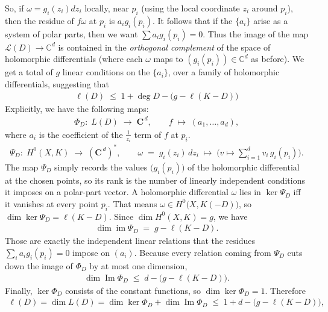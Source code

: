 \documentclass[12pt]{article}
\begin{document}
    So, if $\omega = g_i(z_i)dz_i$ locally, near $p_i$ (using the local coordinate $z_i$ around $p_i$), then the residue of $f\omega$ at $p_i$ is $a_i g_i(p_i)$. It follows that if the $\{a_i\}$ arise as a system of polar parts, then we want $\sum a_i g_i(p_i) = 0$. Thus the image of the map $\mathcal{L}(D) \to \mathbb{C}^d$ is contained in the \emph{orthogonal complement} of the space of holomorphic differentials (where each $\omega$ maps to $(g_i(p_i)) \in \mathbb{C}^d$ as before). We get a total of $g$ linear conditions on the $\{a_i\}$, over a family of holomorphic differentials, suggesting that
\begin{align*}
\ell(D)\;\le\;1+\deg D-\bigl(g-\ell(K-D)\bigr)
\end{align*}
Explicitly, we have the following maps:
\begin{align*}
\Phi_D:\;L(D)\;\longrightarrow\;\mathbf{C}^{\,d},
\qquad
f\;\longmapsto\;(a_1,\dots,a_d),
\end{align*}
where $a_i$ is the coefficient of the $\tfrac{1}{z_i}$ term of $f$ at $p_i$.
\begin{align*}
\Psi_D:\;H^0(X,K)\;\longrightarrow\;(\mathbf{C}^{\,d})^{\ast},
\qquad
\omega\;=\;g_i(z_i)\,dz_i\;\longmapsto\;
\bigl(v\mapsto\sum_{i=1}^{d}v_i\,g_i(p_i)\bigr).
\end{align*}
The map $\Psi_D$ simply records the values $\bigl(g_i(p_i)\bigr)$ of the holomorphic differential at the chosen points, so its rank is the number of linearly independent conditions it imposes on a polar-part vector. A holomorphic differential $\omega$ lies in $\ker\Psi_D$ iff it vanishes at every point $p_i$.
That means $\omega\in H^0\bigl(X,K(-D)\bigr)$, so $\dim\ker\Psi_D=\ell(K-D)$.
Since $\dim H^0(X,K)=g$, we have
\begin{align*}
\operatorname{dim}\operatorname{im}\Psi_D
\;=\;
g-\ell(K-D).
\end{align*}
Those are exactly the independent linear relations that the residues
$\sum_i a_i g_i(p_i)=0 $ impose on $ (a_i).$
Because every relation coming from \(\Psi_D\) cuts down the image of \(\Phi_D\) by at most one dimension,
\begin{align*}
\dim\operatorname{Im}\Phi_D
\;\le\;
d-\bigl(g-\ell(K-D)\bigr).
\end{align*}
Finally, \(\ker\Phi_D\) consists of the constant functions, so
\(\dim\ker\Phi_D=1\). Therefore
\begin{align*}
\ell(D)
=\dim L(D)
=\dim\ker\Phi_D+\dim\operatorname{Im}\Phi_D
\;\le\;
1+d-\bigl(g-\ell(K-D)\bigr),
\end{align*}
\end{document}

